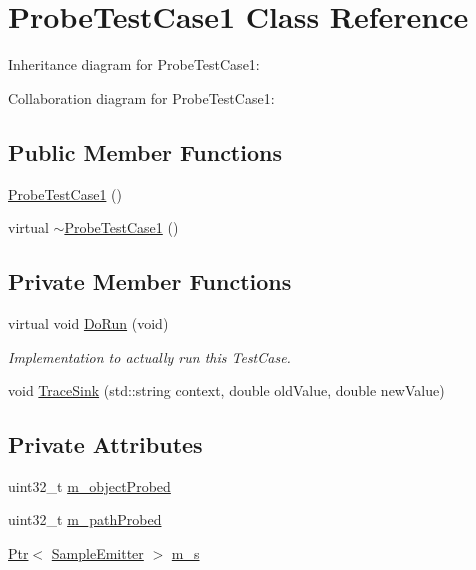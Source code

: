 \hypertarget{classProbeTestCase1}{}\section{Probe\+Test\+Case1 Class Reference}
\label{classProbeTestCase1}


Inheritance diagram for Probe\+Test\+Case1\+:


Collaboration diagram for Probe\+Test\+Case1\+:
\subsection*{Public Member Functions}
\begin{DoxyCompactItemize}
\item 
\hyperlink{classProbeTestCase1_a2af89082d6c26498f9ab1127746b2a8f}{Probe\+Test\+Case1} ()
\item 
virtual \hyperlink{classProbeTestCase1_a15576b31e69388f38c47ddc33ba7c292}{$\sim$\+Probe\+Test\+Case1} ()
\end{DoxyCompactItemize}
\subsection*{Private Member Functions}
\begin{DoxyCompactItemize}
\item 
virtual void \hyperlink{classProbeTestCase1_a57e92e894f2e6df869238e25f09d7c9a}{Do\+Run} (void)
\begin{DoxyCompactList}\small\item\em Implementation to actually run this Test\+Case. \end{DoxyCompactList}\item 
void \hyperlink{classProbeTestCase1_a3a4460631c38c611169287e88ea0df39}{Trace\+Sink} (std\+::string context, double old\+Value, double new\+Value)
\end{DoxyCompactItemize}
\subsection*{Private Attributes}
\begin{DoxyCompactItemize}
\item 
uint32\+\_\+t \hyperlink{classProbeTestCase1_ac09be6977693c6332bfcc9a68dd7c0a9}{m\+\_\+object\+Probed}
\item 
uint32\+\_\+t \hyperlink{classProbeTestCase1_a40dc8f26332f36646863aeceb9f101ee}{m\+\_\+path\+Probed}
\item 
\hyperlink{classns3_1_1Ptr}{Ptr}$<$ \hyperlink{classSampleEmitter}{Sample\+Emitter} $>$ \hyperlink{classProbeTestCase1_a982ddaa77f28cc097601f056e2174ec3}{m\+\_\+s}
\end{DoxyCompactItemize}
